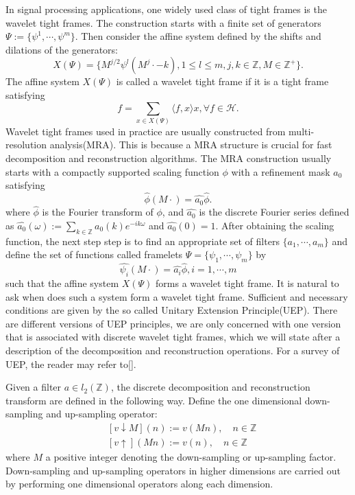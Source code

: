 \documentclass[a4paper]{article}
\begin{document}
In signal processing applications, one widely used class of tight frames is the wavelet tight frames. The construction starts with a finite set of generators $\Psi:=\{\psi^1,\cdots,\psi^m\}$. Then consider the affine system defined by the shifts and dilations of the generators:
\[
	X(\Psi)=\{M^{j/2}\psi^{l}(M^j\cdot -k),1\leq l\leq m, j,k\in\mathbb{Z}, M\in\mathbb{Z^+}\}.
\]
The affine system $X(\Psi)$ is called a wavelet tight frame if it is a tight frame satisfying
\[
	f=\sum_{x\in X(\Psi)} \langle f,x\rangle x, \forall f \in \mathcal{H}.
\]
Wavelet tight frames used in practice are usually constructed from multi-resolution analysis(MRA). This is because a MRA structure is crucial for fast decomposition and reconstruction algorithms.  The MRA construction usually starts with a compactly supported scaling function $\phi$ with a refinement mask  $a_0$ satisfying
\[
	\hat{\phi}(M\cdot)=\hat{a_0}\hat{\phi}.
\]
where $\hat{\phi}$ is the Fourier transform of $\phi$, and $\hat{a_0}$ is the discrete Fourier series defined as $\hat{a_0}(\omega):=\sum_{k\in\mathbb{Z}} a_0(k) e^{-ik\omega}$ and $\hat{a_0}(0)=1$. After obtaining the scaling function, the next step step is to find an appropriate set of filters $\{a_1,\cdots,a_m\}$ and define the set of functions called framelets $\Psi=\{\psi_1,\cdots,\psi_m\}$ by
\[
	\hat{\psi_i}(M\cdot) = \hat{a_i}\hat{\phi},i=1,\cdots,m
\]
such that the affine system $X(\Psi)$ forms a wavelet tight frame. It is natural to ask when does such a system form a wavelet tight frame. Sufficient and necessary conditions are given by the so called Unitary Extension Principle(UEP). There are different versions of UEP principles, we are only concerned with one version that is associated with discrete wavelet tight frames, which we will state after a description of the decomposition and reconstruction operations. For a survey of UEP, the reader may refer to[].

Given a filter $a\in l_2(\mathbb{Z})$, the discrete decomposition and reconstruction transform are defined in the following way. Define the one dimensional down-sampling and up-sampling operator:
\[
	\begin{aligned}
		&[v\downarrow M](n):=v(Mn),\quad n\in \mathbb{Z}\\
		&[v\uparrow](Mn):=v(n), \quad n\in \mathbb{Z}
	\end{aligned}
\]
where $M$ a positive integer denoting the down-sampling or up-sampling factor. Down-sampling and up-sampling operators in higher dimensions are carried out by performing one dimensional operators along each dimension. 
\end{document}

